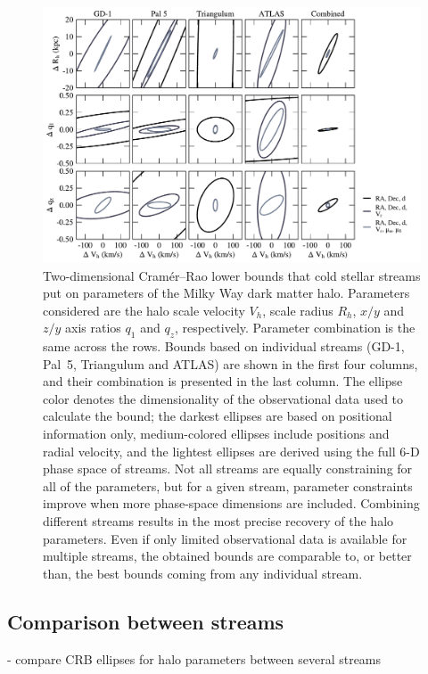 \documentclass[modern]{aastex61}
\begin{document}
\begin{figure}
\begin{center}
\includegraphics[width=\textwidth]{crlb_2d.pdf}
\caption{Two-dimensional Cram\' er--Rao lower bounds that cold stellar streams put on parameters of the Milky Way dark matter halo.
Parameters considered are the halo scale velocity $V_h$, scale radius $R_h$, $x/y$ and $z/y$ axis ratios $q_1$ and $q_z$, respectively.
Parameter combination is the same across the rows.
Bounds based on individual streams (GD-1, Pal~5, Triangulum and ATLAS) are shown in the first four columns, and their combination is presented in the last column.
The ellipse color denotes the dimensionality of the observational data used to calculate the bound; the darkest ellipses are based on positional information only, medium-colored ellipses include positions and radial velocity, and the lightest ellipses are derived using the full 6-D phase space of streams.
Not all streams are equally constraining for all of the parameters, but for a given stream, parameter constraints improve when more phase-space dimensions are included.
Combining different streams results in the most precise recovery of the halo parameters.
Even if only limited observational data is available for multiple streams, the obtained bounds are comparable to, or better than, the best bounds coming from any individual stream.
}
\label{fig:2dbounds}
\end{center}
\end{figure}

\subsection{Comparison between streams}
- compare CRB ellipses for halo parameters between several streams
\end{document}
